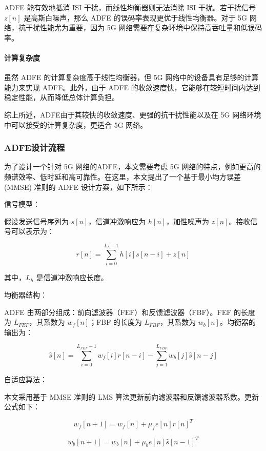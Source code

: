 \documentclass[UTF8,a4paper,12pt]{ctexart}
\numberwithin{equation}{section}
\begin{document}
ADFE 能有效地抵消 ISI 干扰，而线性均衡器则无法消除 ISI 干扰。若干扰信号 $z[n]$ 是高斯白噪声，那么 ADFE 的误码率表现更优于线性均衡器。对于 5G 网络，抗干扰性能尤为重要，因为 5G 网络需要在复杂环境中保持高吞吐量和低误码率。

\paragraph{计算复杂度}
虽然 ADFE 的计算复杂度高于线性均衡器，但 5G 网络中的设备具有足够的计算能力来实现 ADFE。此外，由于 ADFE 的收敛速度快，它能够在较短时间内达到稳定性能，从而降低总体计算负担。

综上所述，ADFE由于其较快的收敛速度、更强的抗干扰性能以及在 5G 网络环境中可以接受的计算复杂度，更适合 5G 网络。
\subsubsection{ADFE设计流程}
为了设计一个针对 5G 网络的ADFE，本文需要考虑 5G 网络的特点，例如更高的频谱效率、低时延和高可靠性。在这里，本文提出了一个基于最小均方误差 (MMSE) 准则的 ADFE 设计方案，如下所示：

信号模型：

假设发送信号序列为 $s[n]$，信道冲激响应为 $h[n]$，加性噪声为 $z[n]$。接收信号可以表示为：

\begin{equation}
	r[n] = \sum_{i=0}^{L_h-1} h[i]s[n-i] + z[n]
\end{equation}

其中，$L_h$ 是信道冲激响应长度。

均衡器结构：

ADFE 由两部分组成：前向滤波器（FEF）和反馈滤波器（FBF）。FEF 的长度为 $L_{FEF}$，其系数为 $w_f[n]$；FBF 的长度为 $L_{FBF}$，其系数为 $w_b[n]$。均衡器的输出为：

\begin{equation}
	\hat{s}[n] = \sum_{i=0}^{L_{FEF}-1} w_f[i]r[n-i] - \sum_{j=1}^{L_{FBF}} w_b[j] \hat{s}[n-j]
\end{equation}

自适应算法：

本文采用基于 MMSE 准则的 LMS 算法更新前向滤波器和反馈滤波器系数。更新公式如下：

\begin{equation}
	w_f[n+1] = w_f[n] + \mu_f e[n] r[n]^{T}
\end{equation}

\begin{equation}
	w_b[n+1] = w_b[n] + \mu_b e[n] \hat{s}[n-1]^{T}
\end{equation}
\end{document}
